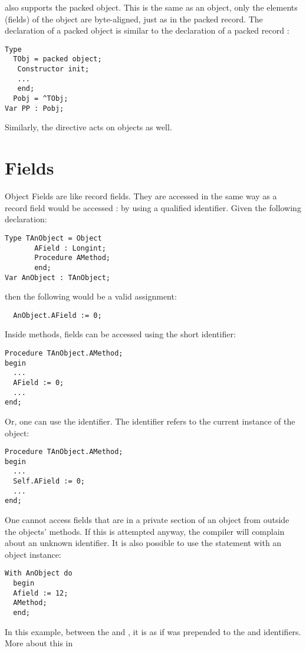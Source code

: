 \begin{remark}
\fpc also supports the packed object. This is the same as an object, only
the elements (fields) of the object are byte-aligned, just as in the packed
record.
The declaration of a packed object is similar to the declaration
of a packed record :
\begin{verbatim}
Type
  TObj = packed object;
   Constructor init;
   ...
   end;
  Pobj = ^TObj;
Var PP : Pobj;
\end{verbatim}
Similarly, the  directive acts on objects as well.
\end{remark}
\section{Fields}
Object Fields are like record fields. They are accessed in the same way as
a record field  would be accessed : by using a qualified identifier. Given the
following declaration:
\begin{verbatim}
Type TAnObject = Object
       AField : Longint;
       Procedure AMethod;
       end;
Var AnObject : TAnObject;
\end{verbatim}
then the following would be a valid assignment:
\begin{verbatim}
  AnObject.AField := 0;
\end{verbatim}
Inside methods, fields can be accessed using the short identifier:
\begin{verbatim}
Procedure TAnObject.AMethod;
begin
  ...
  AField := 0;
  ...
end;
\end{verbatim}
Or, one can use the  identifier. The  identifier refers
to the current instance of the object:
\begin{verbatim}
Procedure TAnObject.AMethod;
begin
  ...
  Self.AField := 0;
  ...
end;
\end{verbatim}
One cannot access fields that are in a private section of an object from
outside the objects' methods. If this is attempted anyway, the compiler will complain about
an unknown identifier.
It is also possible to use the  statement with an object instance:
\begin{verbatim}
With AnObject do
  begin
  Afield := 12;
  AMethod;
  end;
\end{verbatim}
In this example, between the  and , it is as if
 was prepended to the  and 
identifiers. More about this in 

